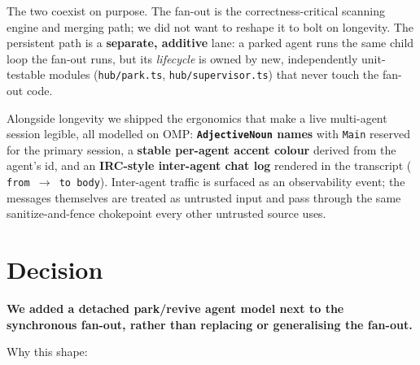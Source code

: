 \documentclass[11pt]{article}
\begin{document}
The two coexist on purpose. The fan-out is the correctness-critical scanning
engine and merging path; we did not want to reshape it to bolt on longevity. The
persistent path is a \textbf{separate, additive} lane: a parked agent runs the
same child loop the fan-out runs, but its \textit{lifecycle} is owned by new,
independently unit-testable modules (\texttt{hub/park.ts},
\texttt{hub/supervisor.ts}) that never touch the fan-out code.

Alongside longevity we shipped the ergonomics that make a live multi-agent session
legible, all modelled on OMP: \textbf{\texttt{AdjectiveNoun} names} with
\texttt{Main} reserved for the primary session, a \textbf{stable per-agent accent
colour} derived from the agent's id, and an \textbf{IRC-style inter-agent chat
log} rendered in the transcript (\texttt{\guillemotright{} from $\rightarrow$ to body}). Inter-agent traffic
is surfaced as an observability event; the messages themselves are treated as
untrusted input and pass through the same sanitize-and-fence chokepoint every
other untrusted source uses.

\section{Decision}

\textbf{We added a detached park/revive agent model next to the synchronous
fan-out, rather than replacing or generalising the fan-out.}

Why this shape:
\end{document}
